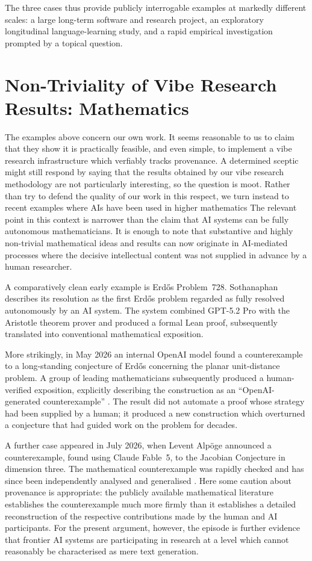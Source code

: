 \documentclass[12pt]{article}
\begin{document}
The three cases thus provide publicly interrogable examples at markedly different scales: a large long-term software and research project, an exploratory longitudinal language-learning study, and a rapid empirical investigation prompted by a topical question.

\section{Non-Triviality of Vibe Research Results: Mathematics}

The examples above concern our own work. It seems reasonable to us to claim that they show it is practically feasible, and even simple, to implement a vibe research infrastructure which verfiably tracks provenance. A determined sceptic might still respond by saying that the results obtained by our vibe research methodology are not particularly interesting, so the question is moot. Rather than try to defend the quality of our work in this respect, we turn instead to recent examples where AIs have been used in higher mathematics
The relevant point in this context is narrower than the claim that AI systems can be fully autonomous mathematicians. It is enough to note that substantive and highly non-trivial mathematical ideas and results can now originate in AI-mediated processes where the decisive intellectual content was not supplied in advance by a human researcher.

A comparatively clean early example is Erd\H{o}s Problem~728. Sothanaphan \citeyearpar{sothanaphan2026erdos728} describes its resolution as the first Erd\H{o}s problem regarded as fully resolved autonomously by an AI system. The system combined GPT-5.2 Pro with the Aristotle theorem prover and produced a formal Lean proof, subsequently translated into conventional mathematical exposition.

More strikingly, in May 2026 an internal OpenAI model found a counterexample to a long-standing conjecture of Erd\H{o}s concerning the planar unit-distance problem. A group of leading mathematicians subsequently produced a human-verified exposition, explicitly describing the construction as an ``OpenAI-generated counterexample'' \citep{alonEtAl2026unitdistance}. The result did not automate a proof whose strategy had been supplied by a human; it produced a new construction which overturned a conjecture that had guided work on the problem for decades.

A further case appeared in July 2026, when Levent Alp\"oge announced a counterexample, found using Claude Fable~5, to the Jacobian Conjecture in dimension three. The mathematical counterexample was rapidly checked and has since been independently analysed and generalised \citep{gao2026jacobian,lee2026jacobian}. Here some caution about provenance is appropriate: the publicly available mathematical literature establishes the counterexample much more firmly than it establishes a detailed reconstruction of the respective contributions made by the human and AI participants. For the present argument, however, the episode is further evidence that frontier AI systems are participating in research at a level which cannot reasonably be characterised as mere text generation.
\end{document}
